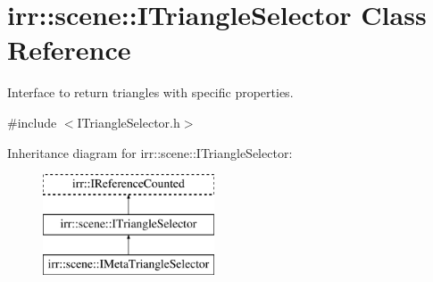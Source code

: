 \hypertarget{classirr_1_1scene_1_1ITriangleSelector}{}\section{irr\+:\+:scene\+:\+:I\+Triangle\+Selector Class Reference}
\label{classirr_1_1scene_1_1ITriangleSelector}


Interface to return triangles with specific properties.  




{\ttfamily \#include $<$I\+Triangle\+Selector.\+h$>$}

Inheritance diagram for irr\+:\+:scene\+:\+:I\+Triangle\+Selector\+:\begin{figure}[H]
\begin{center}
\leavevmode
\includegraphics[height=3.000000cm]{classirr_1_1scene_1_1ITriangleSelector}
\end{center}
\end{figure}
